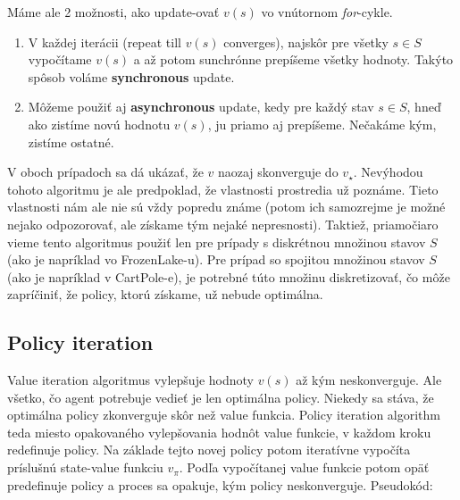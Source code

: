 \documentclass[letterpaper,12pt]{article}
\begin{document}
Máme ale 2 možnosti, ako update-ovať $v(s)$ vo vnútornom \textit{for}-cykle.
\begin{enumerate}
	\item V každej iterácii (repeat till $v(s)$ converges), najskôr pre všetky $s \in S$ vypočítame $v(s)$ a až potom sunchrónne prepíšeme všetky hodnoty. Takýto spôsob voláme \textbf{synchronous} update.
	\item Môžeme použiť aj \textbf{asynchronous} update, kedy pre každý stav $s \in S$, hneď ako zistíme novú hodnotu $v(s)$, ju priamo aj prepíšeme. Nečakáme kým, zistíme ostatné. 
\end{enumerate}

V oboch prípadoch sa dá ukázať, že $v$ naozaj skonverguje do $v_\star$. Nevýhodou tohoto algoritmu je ale predpoklad, že vlastnosti prostredia už poznáme. Tieto vlastnosti nám ale nie sú vždy popredu známe (potom ich samozrejme je možné nejako odpozorovať, ale získame tým nejaké nepresnosti). Taktiež, priamočiaro vieme tento algoritmus použiť len pre prípady s diskrétnou množinou stavov $S$ (ako je napríklad vo FrozenLake-u). Pre prípad so spojitou množinou stavov $S$ (ako je napríklad v CartPole-e), je potrebné túto množinu diskretizovať, čo môže zapríčiniť, že policy, ktorú získame, už nebude optimálna.

\subsection{Policy iteration}

Value iteration algoritmus vylepšuje hodnoty $v(s)$ až kým neskonverguje. Ale všetko, čo agent potrebuje vedieť je len optimálna policy. Niekedy sa stáva, že optimálna policy zkonverguje skôr než value funkcia. Policy iteration algorithm teda miesto opakovaného vylepšovania hodnôt value funkcie, v každom kroku redefinuje policy. Na základe tejto novej policy potom iteratívne vypočíta príslušnú state-value funkciu $v_\pi$. Podľa vypočítanej value funkcie potom opäť predefinuje policy a proces sa opakuje, kým policy neskonverguje. Pseudokód:
\end{document}
